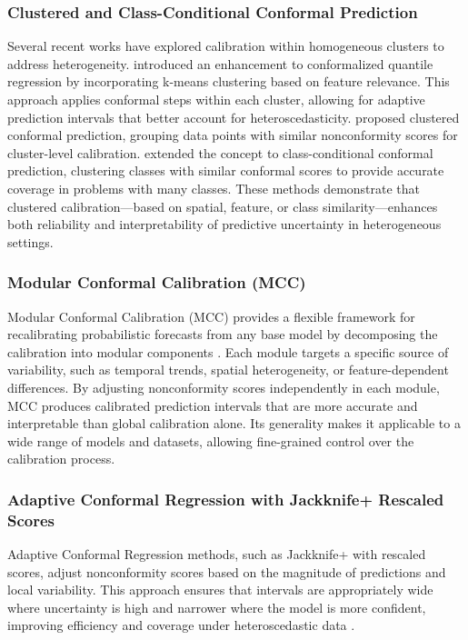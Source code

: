 \documentclass[ruler]{CUP-JNL-EDS}%
\begin{document}
\subsubsection*{Clustered and Class-Conditional Conformal Prediction}
Several recent works have explored calibration within homogeneous clusters to address heterogeneity. \citet{sousa2022} 
introduced an enhancement to conformalized quantile regression by incorporating k-means clustering based on feature relevance. 
This approach applies conformal steps within each cluster, allowing for adaptive prediction intervals that better 
account for heteroscedasticity. \citet{hjort2024} proposed clustered conformal prediction, grouping data points with similar 
nonconformity scores for cluster-level calibration. \citet{ding2023} extended the concept to class-conditional conformal 
prediction, clustering classes with similar conformal scores to provide accurate coverage in problems with many classes. 
These methods demonstrate that clustered calibration—based on spatial, feature, or class similarity—enhances both 
reliability and interpretability of predictive uncertainty in heterogeneous settings.

\subsubsection*{Modular Conformal Calibration (MCC)}
Modular Conformal Calibration (MCC) provides a flexible framework for recalibrating probabilistic forecasts 
from any base model by decomposing the calibration into modular components \citep{marx2022}. Each module 
targets a specific source of variability, such as temporal trends, spatial heterogeneity, or feature-dependent 
differences. By adjusting nonconformity scores independently in each module, MCC produces calibrated prediction 
intervals that are more accurate and interpretable than global calibration alone. Its generality makes it 
applicable to a wide range of models and datasets, allowing fine-grained control over the calibration process.

\subsubsection*{Adaptive Conformal Regression with Jackknife+ Rescaled Scores}
Adaptive Conformal Regression methods, such as Jackknife+ with rescaled scores, adjust nonconformity scores based 
on the magnitude of predictions and local variability. This approach ensures that intervals are appropriately wide 
where uncertainty is high and narrower where the model is more confident, improving efficiency and coverage under 
heteroscedastic data \citep{deutschmann2023}.\\
\end{document}
